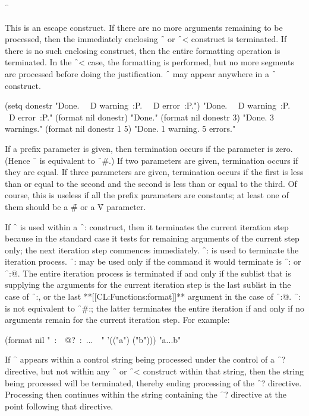 {\f{~\hat }}

This is an escape construct.  If there are no more arguments remaining to be processed, then the immediately            enclosing \f{~\lbr  } or \f{~<} construct is terminated.  If there is no such enclosing construct, then the entire formatting operation is terminated.   In the \f{~<} case, the formatting is performed, but no more segments are processed before doing the justification.      \f{~\hat } may appear anywhere in a \f{~\lbr  } construct.

\code
 (setq donestr "Done.~{\hat} ~D warning~:P.~{\hat} ~D error~:P.") \EV "Done.~{\hat} ~D warning~:P.~{\hat} ~D error~:P."
 (format nil donestr) \EV "Done."
 (format nil donestr 3) \EV "Done. 3 warnings."
 (format nil donestr 1 5) \EV "Done. 1 warning. 5 errors." \endcode
                                

If a prefix parameter is given, then termination occurs if the parameter is zero.  (Hence \f{~{\hat}} is equivalent to  \f{~\#{\hat}}.)  If two parameters are given, termination occurs if they are equal.   If three parameters are given, termination occurs if the first is less than or equal to the second and the second is less than or equal to the third. Of course, this is useless if all the prefix parameters are constants; at least one of them should be a \f{\#} or a \f{V} parameter.

If \f{~{\hat}} is used within a \f{~:\lbr  }  construct, then it terminates the current iteration step because in the standard case it tests for remaining arguments of the current step only; the next iteration step commences immediately.  \f{~:{\hat}} is used to terminate the iteration process.  \f{~:{\hat}}  may be used only if the command it would terminate is  \f{~:\lbr  } or \f{~:@\lbr  }. The entire iteration process is terminated if and only if the sublist that is supplying the arguments for the current iteration step is the last sublist in the case of \f{~:\lbr },  or the last **[[CL:Functions:format]]**         argument in the case of \f{~:@\lbr  }.  \f{~:{\hat}} is not equivalent to \f{~\#:{\hat}};  the latter terminates the entire iteration if and only if no arguments remain for the current iteration step. For example:

\code
 (format nil "~:\lbr\ ~@?~:\hat\ ...~\rbr\ " '(("a") ("b"))) \EV "a...b" \endcode

If \f{~{\hat}} appears within a control string being processed under the control of a \f{~?} directive, but not within any \f{~\lbr  } or \f{~<} construct within that string, then the string being processed will be terminated, thereby ending processing of the \f{~?} directive.  Processing then continues within the string    containing the \f{~?} directive at the point following that directive.

